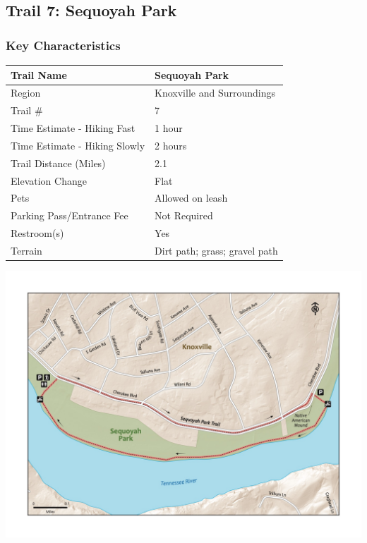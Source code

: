 \documentclass[
  letterpaper,
  DIV=11,
  numbers=noendperiod]{scrartcl}
\begin{document}
\hypertarget{trail-7-sequoyah-park}{%
\subsection{Trail 7: Sequoyah Park}\label{trail-7-sequoyah-park}}

\hypertarget{key-characteristics-6}{%
\subsubsection{Key Characteristics}\label{key-characteristics-6}}

\begin{longtable}[]{@{}ll@{}}
\toprule\noalign{}
Trail Name & Sequoyah Park \\
\midrule\noalign{}
\endhead
\bottomrule\noalign{}
\endlastfoot
Region & Knoxville and Surroundings \\
Trail \# & 7 \\
Time Estimate - Hiking Fast & 1 hour \\
Time Estimate - Hiking Slowly & 2 hours \\
Trail Distance (Miles) & 2.1 \\
Elevation Change & Flat \\
Pets & Allowed on leash \\
Parking Pass/Entrance Fee & Not Required \\
Restroom(s) & Yes \\
Terrain & Dirt path; grass; gravel path \\
\end{longtable}

\includegraphics{maps/trail-07-map.jpeg}
\end{document}
